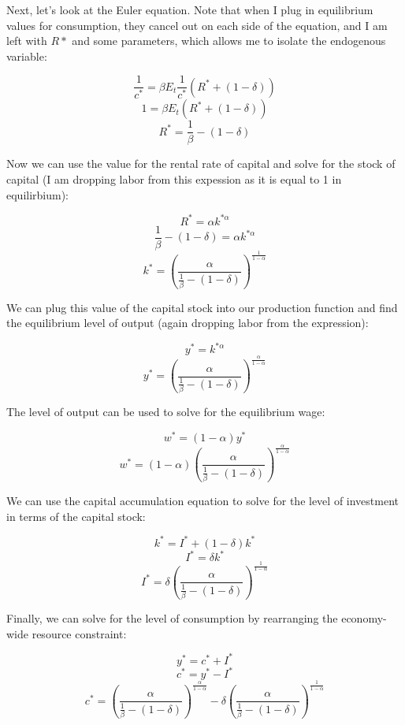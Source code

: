 \documentclass[12pt]{article}
\begin{document}
Next, let's look at the Euler equation. Note that when I plug in equilibrium values for consumption, they cancel out on each side of the equation, and I am left with \(R*\) and some parameters, which allows me to isolate the endogenous variable:

\[ \frac{1}{c^*} = \beta E_t \frac{1}{c^*}(R^* + (1-\delta)) \]
\[ 1 = \beta E_t (R^* + (1-\delta)) \]
\begin{equation}
R^* = \frac{1}{\beta}-(1-\delta)
\end{equation}

Now we can use the value for the rental rate of capital and solve for the stock of capital (I am dropping labor from this expession as it is equal to 1 in equilirbium):

\[ R^* = \alpha k^{*\alpha} \]
\[ \frac{1}{\beta}-(1-\delta) = \alpha k^{*\alpha} \]
\begin{equation}
k^* = \left(\frac{\alpha}{\frac{1}{\beta}-(1-\delta)}\right)^{\frac{1}{1-\alpha}}
\end{equation}

We can plug this value of the capital stock into our production function and find the equilibrium level of output (again dropping labor from the expression):

\[ y^* = k^{*\alpha} \]
\begin{equation}
y^* = \left(\frac{\alpha}{\frac{1}{\beta}-(1-\delta)}\right)^{\frac{\alpha}{1-\alpha}}
\end{equation}

The level of output can be used to solve for the equilibrium wage:

\[ w^* = (1-\alpha) y^* \]
\begin{equation}
w^* = (1-\alpha)\left(\frac{\alpha}{\frac{1}{\beta}-(1-\delta)}\right)^{\frac{\alpha}{1-\alpha}}
\end{equation}

We can use the capital accumulation equation to solve for the level of investment in terms of the capital stock:

\[ k^* = I^* + (1-\delta) k^* \]
\[ I^* = \delta k^* \]
\begin{equation}
I^* = \delta \left(\frac{\alpha}{\frac{1}{\beta}-(1-\delta)}\right)^{\frac{1}{1-\alpha}}
\end{equation}

Finally, we can solve for the level of consumption by rearranging the economy-wide resource constraint:

\[ y^* = c^* + I^* \]
\[ c^* = y^* - I^* \]
\begin{equation}
c^* = \left(\frac{\alpha}{\frac{1}{\beta}-(1-\delta)}\right)^{\frac{\alpha}{1-\alpha}} - \delta \left(\frac{\alpha}{\frac{1}{\beta}-(1-\delta)}\right)^{\frac{1}{1-\alpha}}
\end{equation}
\end{document}
